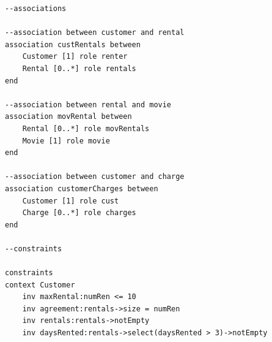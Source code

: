\documentclass{article}
\begin{document}
\begin{Verbatim}
--associations

--association between customer and rental
association custRentals between
	Customer [1] role renter
	Rental [0..*] role rentals
end

--association between rental and movie
association movRental between
	Rental [0..*] role movRentals
	Movie [1] role movie
end

--association between customer and charge
association customerCharges between
	Customer [1] role cust
	Charge [0..*] role charges
end

--constraints

constraints
context Customer
	inv maxRental:numRen <= 10
	inv agreement:rentals->size = numRen
	inv rentals:rentals->notEmpty
	inv daysRented:rentals->select(daysRented > 3)->notEmpty
\end{Verbatim}
	
\end{document}
